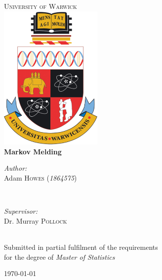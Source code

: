 \documentclass[11pt,]{book}
\date{}
\begin{document}
\begin{titlepage}

\vspace{1cm}

\center %

\textsc{\LARGE University of Warwick}\\[1.5cm] %

\includegraphics[width = 5cm]{tex/Warwick_crest.png}\\[1.5cm] %

{\huge \bfseries Markov Melding}\\[2.5cm] %

\begin{minipage}{0.4\textwidth}
\begin{flushleft} \large
\emph{Author:}\\
Adam \textsc{Howes} (\emph{1864575}) %
\end{flushleft}
\end{minipage}
~
\begin{minipage}{0.4\textwidth}
\begin{flushright} \large
\emph{Supervisor:} \\
Dr. Murray \textsc{Pollock} %
\end{flushright}
\end{minipage}\\[2cm]

{\large Submitted in partial fulfilment of the requirements \\ for the degree of \emph{Master of Statistics}}

{\large \today}\\[2cm] %

\vfill %

\end{titlepage}
\end{document}
